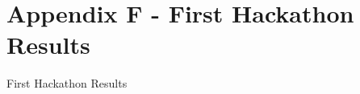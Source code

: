 \cleardoublepage%
\chapter*{\label{chap:apx_g}Appendix F - First Hackathon Results}%
%

First Hackathon Results